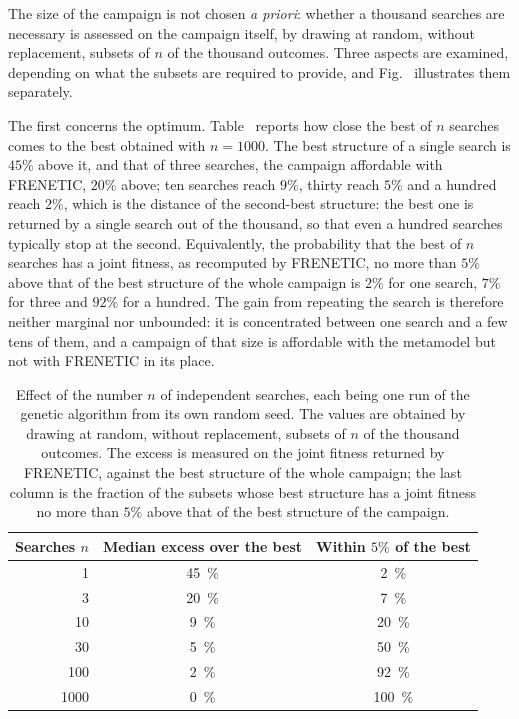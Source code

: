 The size of the campaign is not chosen \emph{a priori}: whether a thousand
searches are necessary is assessed on the campaign itself, by drawing at random,
without replacement, subsets of $n$ of the thousand outcomes. Three aspects
are examined, depending on what the subsets are required to provide, and
Fig.~ illustrates them separately.

The first concerns the optimum.
Table~ reports how close the best of $n$ searches comes to
the best obtained with $n = 1000$. The best structure of a single search is $45\%$ above it, and
that of three searches, the campaign affordable with FRENETIC, $20\%$ above; ten
searches reach $9\%$, thirty reach $5\%$ and a hundred reach $2\%$, which is
the distance of the second-best structure: the best one is returned by a
single search out of the thousand, so that even a hundred searches typically
stop at the second. Equivalently, the probability that the best of $n$
searches has a joint fitness, as recomputed by FRENETIC, no more than $5\%$
above that of the best structure of the whole campaign is $2\%$ for one
search, $7\%$ for three and $92\%$ for a hundred. The gain from repeating the
search is therefore neither marginal nor unbounded: it is concentrated between
one search and a few tens of them, and a campaign of that size is affordable
with the metamodel but not with FRENETIC in its place.

\begin{table}[htbp]
\centering
\caption[Effect of the number of independent searches]{Effect of the number
$n$ of independent searches, each being one run of the genetic algorithm from
its own random seed. The values are obtained by drawing at random, without
replacement, subsets of $n$ of the thousand outcomes. The excess is measured on the joint
fitness returned by FRENETIC, against the best structure of the whole campaign;
the last column is the fraction of the subsets whose best structure has a joint
fitness no more than $5\%$ above that of the best structure of the campaign.}
\label{eg:tab:howmany}
\begin{tabular}{rcc}
\toprule
Searches $n$ & Median excess over the best & Within $5\%$ of the best \\ \midrule
    1    & \SI{45}{\percent} & \SI{2}{\percent} \\
    3    & \SI{20}{\percent} & \SI{7}{\percent} \\
    10   & \SI{9}{\percent}  & \SI{20}{\percent} \\
    30   & \SI{5}{\percent}  & \SI{50}{\percent} \\
    100  & \SI{2}{\percent}  & \SI{92}{\percent} \\
    1000 & \SI{0}{\percent}  & \SI{100}{\percent} \\
\bottomrule
\end{tabular}
\end{table}

